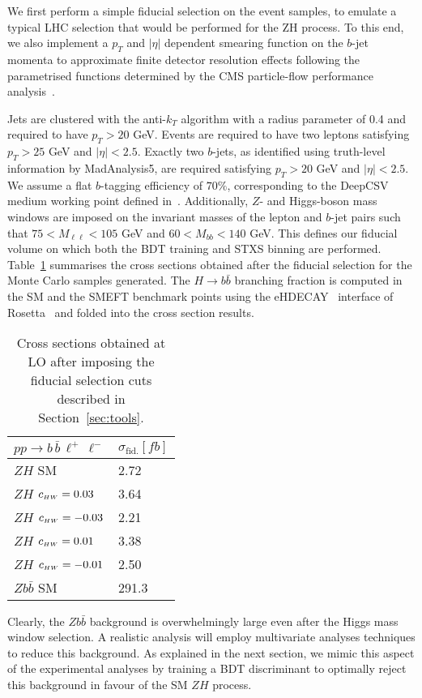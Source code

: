 We first perform a simple fiducial selection on the event samples, to emulate a typical LHC selection that would be performed for the ZH process. To this end, we also implement a $p_T$ and $|\eta|$ dependent smearing function on the $b$-jet momenta to approximate finite detector resolution effects following the parametrised functions determined by the CMS particle-flow performance analysis~\cite{Sirunyan:2017ulk}.

Jets are clustered with the anti-$k_T$ algorithm with a radius parameter of 0.4 and required to have $p_T > 20$ GeV. Events are required to have two leptons satisfying $p_T > 25$ GeV and $|\eta|< 2.5$. Exactly two $b$-jets, as identified using truth-level information by {\sc MadAnalysis5}, are required satisfying $p_T > 20$ GeV and $|\eta|< 2.5$. We assume a flat $b$-tagging efficiency of $70\%$, corresponding to the DeepCSV medium working point defined in~\cite{Sirunyan:2017ezt}. Additionally, $Z$- and Higgs-boson mass windows are imposed on the invariant masses of the lepton and $b$-jet pairs such that $75 < M_{\ell\ell} < 105$ GeV and  $60 < M_{bb} < 140$ GeV. This defines our fiducial volume on which both the BDT training and STXS binning are performed. Table~\ref{tab:FiducialXS} summarises the cross sections obtained after the fiducial selection for the Monte Carlo samples generated. The $H\to b\bar{b}$ branching fraction is computed in the SM and the SMEFT benchmark points using the e{\sc HDECAY}~\cite{Contino:2014aaa} interface of {\sc Rosetta}~\cite{Falkowski:2015wza} and folded into the cross section results.
%
\begin{table}[h!]
    \centering
    \begin{tabular}{|l|l|}
        \hline
        $pp\to b\,\bar{b}\,\ell^+\,\ell^-$& $\sigma_{\text{fid.}} [fb]$\tabularnewline
        \hline
        $ZH$ SM&2.72\tabularnewline
        $ZH$ $c_{\scriptscriptstyle HW} = 0.03$&3.64\tabularnewline
        $ZH$ $c_{\scriptscriptstyle HW} = -0.03$&2.21\tabularnewline
        $ZH$ $c_{\scriptscriptstyle HW} = 0.01$&3.38\tabularnewline
        $ZH$ $c_{\scriptscriptstyle HW} = -0.01$&2.50\tabularnewline
        $Z b\bar{b}$ SM&291.3\tabularnewline
        \hline
    \end{tabular}
    \caption{\label{tab:FiducialXS} Cross sections obtained at LO after imposing the fiducial selection cuts described in Section~\ref{sec:tools}.}
\end{table}
Clearly, the $Z b\bar{b}$ background is overwhelmingly large even after the Higgs mass
window selection. A realistic analysis will employ multivariate analyses techniques to
reduce this background. As explained in the next section, we mimic this aspect of the
experimental analyses by training a BDT discriminant to optimally reject this background
in favour of the SM $ZH$ process.

